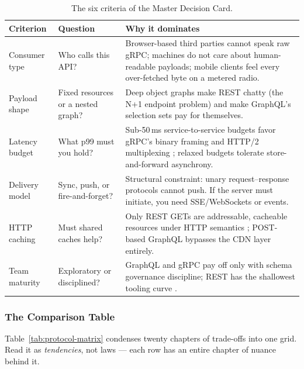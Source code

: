 \begin{table}[htbp]
  \centering
  \small
  \begin{tabularx}{\textwidth}{l l X}
    \toprule
    \textbf{Criterion} & \textbf{Question} & \textbf{Why it dominates} \\
    \midrule
    Consumer type & Who calls this API? &
      Browser-based third parties cannot speak raw gRPC; machines do not care
      about human-readable payloads; mobile clients feel every over-fetched
      byte on a metered radio. \\
    Payload shape & Fixed resources or a nested graph? &
      Deep object graphs make REST chatty (the N+1 endpoint problem) and make
      GraphQL's selection sets pay for themselves. \\
    Latency budget & What p99 must you hold? &
      Sub-50\,ms service-to-service budgets favor gRPC's binary framing and
      HTTP/2 multiplexing \cite{rfc9113,grpcdocs}; relaxed budgets tolerate
      store-and-forward asynchrony. \\
    Delivery model & Sync, push, or fire-and-forget? &
      Structural constraint: unary request--response protocols cannot push.
      If the server must initiate, you need SSE/WebSockets or events. \\
    HTTP caching & Must shared caches help? &
      Only REST GETs are addressable, cacheable resources under HTTP
      semantics \cite{rfc9110}; POST-based GraphQL bypasses the CDN layer
      entirely. \\
    Team maturity & Exploratory or disciplined? &
      GraphQL and gRPC pay off only with schema governance discipline; REST
      has the shallowest tooling curve \cite{gehl2021apidesign}. \\
    \bottomrule
  \end{tabularx}
  \caption{The six criteria of the Master Decision Card.}
  \label{tab:decision-criteria}
\end{table}

\subsubsection{The Comparison Table}

Table~\ref{tab:protocol-matrix} condenses twenty chapters of trade-offs into
one grid. Read it as \emph{tendencies}, not laws --- each row has an entire
chapter of nuance behind it.

